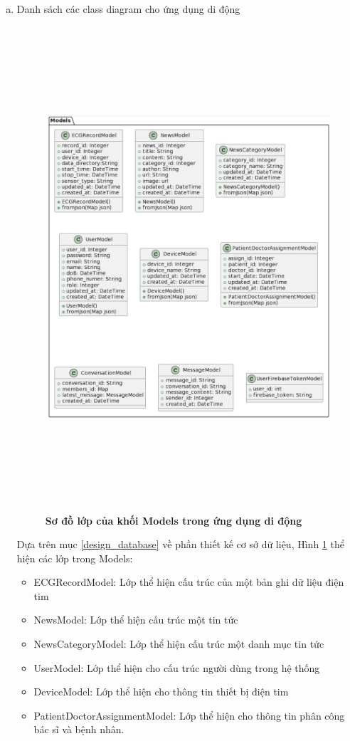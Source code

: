 \begin{enumerate}[a)]
  \item Danh sách các class diagram cho ứng dụng di động
    

  \begin{figure}[H]
    \centering
    \includegraphics[width=16cm,height=18cm]{Images/mobile_app/class_diagram/mobile_class_model.png}
    \caption[Sơ đồ lớp của khối Models trong ứng dụng di động]{\bfseries \fontsize{12pt}{0pt}\selectfont Sơ đồ lớp của khối Models trong ứng dụng di động}
    \label{mobile_class_model} %
  \end{figure}



  Dựa trên mục \ref{design_database} về phần thiết kế cơ sở dữ liệu, Hình \ref{mobile_class_model} thể hiện các lớp trong Models:
  \begin{itemize}
    \item ECGRecordModel: Lớp thể hiện cấu trúc của một bản ghi dữ liệu điện tim
    \item NewsModel: Lớp thể hiện cấu trúc một tin tức
    \item NewsCategoryModel: Lớp thể hiện cấu trúc một danh mục tin tức
    \item UserModel: Lớp thể hiện cho cấu trúc người dùng trong hệ thống
    \item DeviceModel: Lớp thể hiện cho thông tin thiết bị điện tim 
    \item PatientDoctorAssignmentModel: Lớp thể hiện cho thông tin phân công bác sĩ và bệnh nhân.
  \end{itemize}


\end{enumerate}
